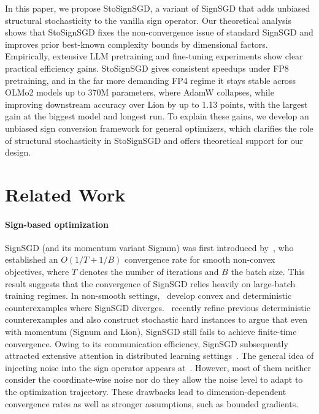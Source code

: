 \documentclass{article}
\begin{document}
In this paper, we propose StoSignSGD, a variant of SignSGD that adds unbiased structural stochasticity to the vanilla sign operator. Our theoretical analysis shows that StoSignSGD fixes the non-convergence issue of standard SignSGD and improves prior best-known complexity bounds by dimensional factors. Empirically, extensive LLM pretraining and fine-tuning experiments show clear practical efficiency gains. StoSignSGD gives consistent speedups under FP8 pretraining, and in the far more demanding FP4 regime it stays stable across OLMo2 models up to 370M parameters, where AdamW collapses, while improving downstream accuracy over Lion by up to 1.13 points, with the largest gain at the biggest model and longest run. To explain these gains, we develop an unbiased sign conversion framework for general optimizers, which clarifies the role of structural stochasticity in StoSignSGD and offers theoretical support for our design.



\newpage
\appendix

\section{Related Work\label{sec:related-work}}

\paragraph{Sign-based optimization}
SignSGD (and its momentum variant Signum) was first introduced by~\citet{bernstein2018signsgd}, who established an $O(1/T+1/B)$ convergence rate for smooth non-convex objectives, where $T$ denotes the number of iterations and $B$ the batch size. This result suggests that the convergence of SignSGD relies heavily on large-batch training regimes. In non-smooth settings,~\citet{karimireddy2019error,xiao2023stochastic} develop convex and deterministic counterexamples where SignSGD diverges.~\citet{yu2026finite} recently refine previous deterministic counterexamples and also construct stochastic hard instances to argue that even with momentum (Signum and Lion), SignSGD still fails to achieve finite-time convergence. Owing to its communication efficiency, SignSGD subsequently attracted extensive attention in distributed learning settings~\citep{bernstein2019signsgd,jin2020stochastic,safaryan2021stochastic}. The general idea of injecting noise into the sign operator appears at~\citep{jin2020stochastic,safaryan2021stochastic,sun2023momentum,chzhen2023signsvrg,NeurIPS:2024:Jiang,jiang2025improved,jiang2026lion}. However, most of them neither consider the coordinate-wise noise nor do they allow the noise level to adapt to the optimization trajectory. These drawbacks lead to dimension-dependent convergence rates as well as stronger assumptions, such as bounded gradients. 
\end{document}
